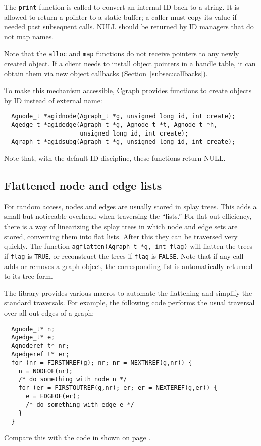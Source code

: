 \documentclass[11pt,letterpaper]{article}
\begin{document}
The \verb"print" function is called to convert an internal ID back to a string.
It is allowed to return a pointer to a static buffer; 
a caller must copy its value if needed past subsequent calls. 
NULL should be returned by ID managers that do not map names.

Note that the \verb"alloc" and \verb"map" functions do not receive pointers to any 
newly created object. If a client needs to install object pointers in a handle table, 
it can obtain them via new object callbacks (Section~\ref{subsec:callbacks}).

To make this mechanism accessible, Cgraph provides functions
to create objects by ID instead of external name:
\begin{verbatim}
  Agnode_t *agidnode(Agraph_t *g, unsigned long id, int create);
  Agedge_t *agidedge(Agraph_t *g, Agnode_t *t, Agnode_t *h, 
                     unsigned long id, int create);
  Agraph_t *agidsubg(Agraph_t *g, unsigned long id, int create);
\end{verbatim}
Note that, with the default ID discipline, these functions return NULL.

\subsection{Flattened node and edge lists}
For random access, nodes and edges are usually stored in splay trees. 
This adds a small but noticeable overhead when traversing the ``lists.''
For flat-out efficiency,
there is a way of linearizing the splay trees in which node
and edge sets are stored, converting them into flat lists.  After
this they can be traversed very quickly. The function
\verb"agflatten(Agraph_t *g, int flag)" 
will flatten the trees if \verb"flag" is \verb"TRUE",
or reconstruct the trees if \verb"flag" is \verb"FALSE".
Note that if any call adds or removes a graph object, the corresponding list
is automatically returned to its tree form.

The library provides various macros to automate the flattening and simplify
the standard traversals. For example, the following code performs the usual
traversal over all out-edges of a graph:
\begin{verbatim}
  Agnode_t* n;
  Agedge_t* e;
  Agnoderef_t* nr;
  Agedgeref_t* er;
  for (nr = FIRSTNREF(g); nr; nr = NEXTNREF(g,nr)) {
    n = NODEOF(nr);
    /* do something with node n */
    for (er = FIRSTOUTREF(g,nr); er; er = NEXTEREF(g,er)) {
      e = EDGEOF(er);
      /* do something with edge e */
    }
  }
\end{verbatim}
Compare this with the code in shown on page \pageref{traversal}. 
\end{document}
